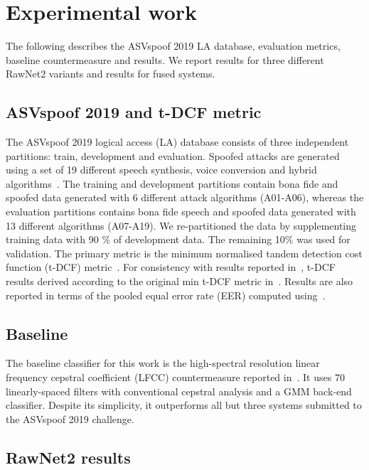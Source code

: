 \documentclass{article}
\begin{document}
\section{Experimental work}
\label{sec:Experimental-set}
The following describes the ASVspoof 2019 LA database, evaluation metrics, baseline countermeasure and results. We report results for three different RawNet2 variants and results for fused systems.

\subsection{ASVspoof 2019 and t-DCF metric}
The ASVspoof 2019 logical access (LA) database consists of three independent partitions: train, development and evaluation. Spoofed attacks are generated using a set of 19 different speech synthesis, voice conversion and hybrid algorithms~\cite{wang2020asvspoof}. The training and development partitions contain bona fide and spoofed data generated with 6 different attack algorithms (A01-A06), whereas the evaluation partitions contains bona fide speech and spoofed data generated with 13 different algorithms (A07-A19). We re-partitioned the data by supplementing training data with 90 \% of development data. The remaining 10\% was used for validation. The primary metric is the minimum normalised tandem detection cost function (t-DCF) metric~\cite{Kinnunen2018-tDCF,kinnunen-tDCF-TASLP}. For consistency with results reported in~\cite{todisco2019asvspoof}, t-DCF results derived according to the original min t-DCF metric in~\cite{Kinnunen2018-tDCF,kinnunen-tDCF-TASLP}.
Results are also reported in terms of the pooled equal error rate (EER) computed using~\cite{brummer2013bosaris}.

\subsection{Baseline}

The baseline classifier for this work is the high-spectral resolution linear frequency cepstral coefficient (LFCC) countermeasure reported in~\cite{IS2020LFCC}. It uses $70$ linearly-spaced filters with conventional cepstral analysis and a GMM back-end classifier. Despite its simplicity, it outperforms all but three systems submitted to the ASVspoof 2019 challenge.


\subsection{RawNet2 results}
\label{ssec:subhead}
\end{document}

